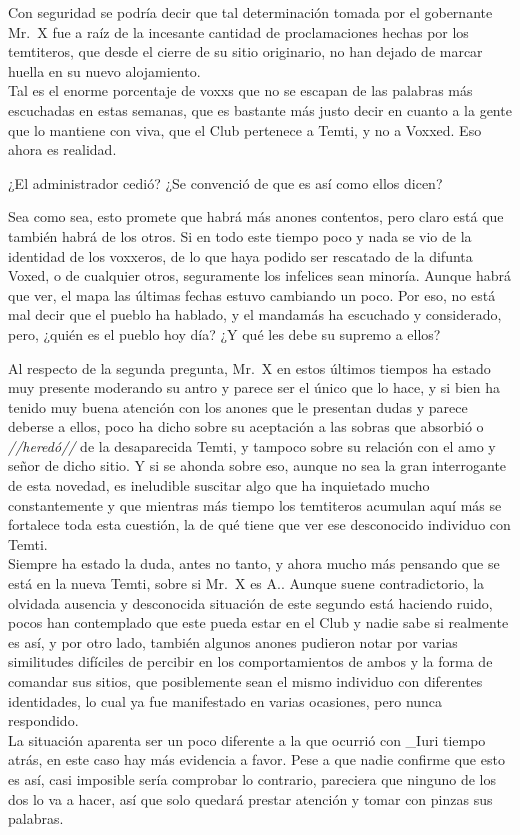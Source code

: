 \documentclass[
  spanish,
]{book}
\begin{document}
Con seguridad se podría decir que tal determinación tomada por el gobernante Mr.~X fue a raíz de la incesante cantidad de proclamaciones hechas por los temtiteros, que desde el cierre de su sitio originario, no han dejado de marcar huella en su nuevo alojamiento.\\
Tal es el enorme porcentaje de voxxs que no se escapan de las palabras más escuchadas en estas semanas, que es bastante más justo decir en cuanto a la gente que lo mantiene con viva, que el Club pertenece a Temti, y no a Voxxed. Eso ahora es realidad.

¿El administrador cedió? ¿Se convenció de que es así como ellos dicen?

Sea como sea, esto promete que habrá más anones contentos, pero claro está que también habrá de los otros. Si en todo este tiempo poco y nada se vio de la identidad de los voxxeros, de lo que haya podido ser rescatado de la difunta Voxed, o de cualquier otros, seguramente los infelices sean minoría. Aunque habrá que ver, el mapa las últimas fechas estuvo cambiando un poco. Por eso, no está mal decir que el pueblo ha hablado, y el mandamás ha escuchado y considerado, pero, ¿quién es el pueblo hoy día? ¿Y qué les debe su supremo a ellos?

Al respecto de la segunda pregunta, Mr.~X en estos últimos tiempos ha estado muy presente moderando su antro y parece ser el único que lo hace, y si bien ha tenido muy buena atención con los anones que le presentan dudas y parece deberse a ellos, poco ha dicho sobre su aceptación a las sobras que absorbió o \emph{//heredó//} de la desaparecida Temti, y tampoco sobre su relación con el amo y señor de dicho sitio. Y si se ahonda sobre eso, aunque no sea la gran interrogante de esta novedad, es ineludible suscitar algo que ha inquietado mucho constantemente y que mientras más tiempo los temtiteros acumulan aquí más se fortalece toda esta cuestión, la de qué tiene que ver ese desconocido individuo con Temti.\\
Siempre ha estado la duda, antes no tanto, y ahora mucho más pensando que se está en la nueva Temti, sobre si Mr.~X es A.. Aunque suene contradictorio, la olvidada ausencia y desconocida situación de este segundo está haciendo ruido, pocos han contemplado que este pueda estar en el Club y nadie sabe si realmente es así, y por otro lado, también algunos anones pudieron notar por varias similitudes difíciles de percibir en los comportamientos de ambos y la forma de comandar sus sitios, que posiblemente sean el mismo individuo con diferentes identidades, lo cual ya fue manifestado en varias ocasiones, pero nunca respondido.\\
La situación aparenta ser un poco diferente a la que ocurrió con \_Iuri tiempo atrás, en este caso hay más evidencia a favor. Pese a que nadie confirme que esto es así, casi imposible sería comprobar lo contrario, pareciera que ninguno de los dos lo va a hacer, así que solo quedará prestar atención y tomar con pinzas sus palabras.
\end{document}
